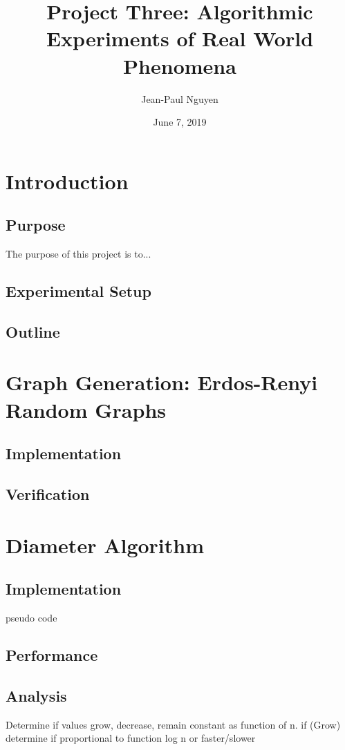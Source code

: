 \documentclass{article}
\title{Project Three: Algorithmic Experiments of Real World Phenomena}
\author{Jean-Paul Nguyen}
\date{June 7, 2019}
\begin{document}
\maketitle
\tableofcontents

\newcommand{\nextblurb}[0]{\vspace{1 em} \newline \noindent}

\pagebreak

\section{Introduction}
\subsection{Purpose}
    The purpose of this project is to...
\subsection{Experimental Setup}
\subsection{Outline}

\section{Graph Generation: Erdos-Renyi Random Graphs}
\subsection{Implementation}
\subsection{Verification}

\section{Diameter Algorithm}
\subsection{Implementation}
    pseudo code
\subsection{Performance}
\subsection{Analysis}
    Determine if values grow, decrease, remain constant as function of n.
    \nextblurb
    if (Grow) determine if proportional to function log n or faster/slower
\end{document}

